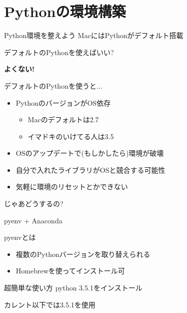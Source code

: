 \documentclass[12pt, dvipdfmx]{beamer}
\begin{document}
\section{Pythonの環境構築}
\begin{frame}{Python環境を整えよう}
    MacにはPythonがデフォルト搭載

    デフォルトのPythonを使えばいい?

    \pause
    \textbf{\alert{よくない!}}
\end{frame}
\begin{frame}{デフォルトのPythonを使うと...}
    \begin{itemize}
        \item PythonのバージョンがOS依存
        \begin{itemize}
            \item Macのデフォルトは2.7
            \item イマドキのいけてる人は3.5
        \end{itemize}
        \item OSのアップデートで(もしかしたら)環境が破壊
        \item 自分で入れたライブラリがOSと競合する可能性
        \item 気軽に環境のリセットとかできない
    \end{itemize}
\end{frame}
\begin{frame}{じゃあどうするの?}
    \begin{center}
        {\Huge pyenv + Anaconda}
    \end{center}
\end{frame}
\begin{frame}{pyenvとは}
    \begin{itemize}
        \item 複数のPythonバージョンを取り替えられる
        \item Homebrewを使ってインストール可
    \end{itemize}
    \begin{exampleblock}{超簡単な使い方}
        python 3.5.1をインストール
        \installpyenv

        カレント以下では3.5.1を使用
        \usepyenv
    \end{exampleblock}
\end{frame}
\end{document}

